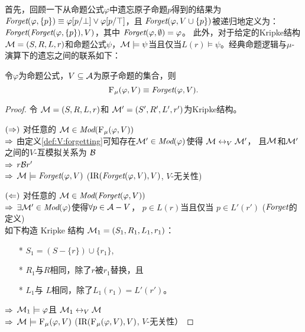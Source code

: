 首先，回顾一下从命题公式$\varphi$中遗忘原子命题$p$得到的结果为$\textit{Forget}(\varphi, \{p\})\equiv \varphi[p/\bot] \vee \varphi[p/\top]$，且 $\textit{Forget}(\varphi, V\cup \{p\})$被递归地定义为： $\textit{Forget}(\textit{Forget}(\varphi, \{p\}),V)$，其中 $\textit{Forget}(\varphi, \emptyset) = \varphi$。
此外，对于给定的Kripke结构${\cal M} = (S, R, L, r)$和命题公式$\psi$，${\cal M} \models  \psi$当且仅当$L(r) \models \psi$。经典命题逻辑与$\mu$-演算下的遗忘之间的联系如下：
\begin{theorem}\label{thm:PL:CTL}
	令$\varphi$为命题公式，$V\subseteq {\cal A}$为原子命题的集合，则
	\[
	{\textsc{F}_{\textsc{$\mu$}}}(\varphi, V) \equiv \textit{Forget}(\varphi, V).
	\]
\end{theorem}
\begin{proof}
	令 ${\cal M} = (S, R, L, r)$和 ${\cal M}' = (S', R', L', r')$为Kripke结构。
	
	$(\Rightarrow)$ 对任意的 ${\cal M} \in \textit{Mod}({\textsc{F}_{\textsc{$\mu$}}}(\varphi, V))$ \\
	$\Rightarrow$ 由定义\ref{def:V:forgetting}可知存在${\cal M}' \in \textit{Mod}(\varphi)$使得 ${\cal M} \leftrightarrow_V {\cal M}'$， %
	且${\cal M}$和${\cal M}'$之间的$V$-互模拟关系为 ${\cal B}$\\
	$\Rightarrow$ $r {\cal B} r'$ \\
	$\Rightarrow$ ${\cal M} \models \textit{Forget}(\varphi, V)$ \hfill ($\textrm{IR}(\textit{Forget}(\varphi, V),V)$, $V$-无关性)
	
	$(\Leftarrow)$ 对任意的 ${\cal M} \in \textit{Mod}(\textit{Forget}(\varphi, V))$ \\
	$\Rightarrow$ $\exists {\cal M}' \in\textit{Mod}(\varphi)$使得$\forall p \in {\cal A}-V$， $p \in L(r)$当且仅当 $p \in L'(r')$ \hfill ($\textit{Forget}$的定义)\\
	
	如下构造 Kripke 结构 ${\cal M}_1 = (S_1, R_1, L_1, r_1)$：
	\begin{itemize}
		\item[*] $S_1 = (S - \{r\}) \cup \{r_1\}$,
		\item[*] $R_1$与$R$相同，除了$r$被$r_1$替换，且
		\item[*] $L_1$与 $L$相同，除了$L_1(r_1) = L'(r')$。
	\end{itemize}
	$\Rightarrow$ ${\cal M}_1 \models \varphi$且 ${\cal M}_1 \leftrightarrow_V {\cal M}$\\
	$\Rightarrow$ ${\cal M} \models {\textsc{F}_{\textsc{$\mu$}}}(\varphi, V)$ \hfill ($\textrm{IR}({\textsc{F}_{\textsc{$\mu$}}}(\varphi, V), V)$, $V$-无关性）
\end{proof}


